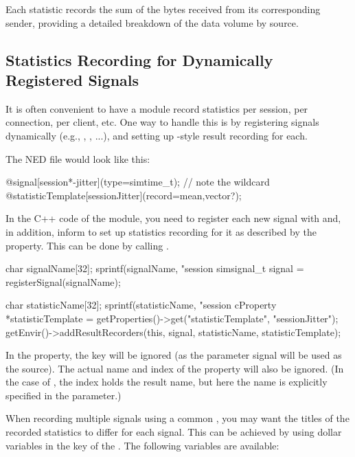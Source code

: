 Each statistic records the sum of the bytes received from its corresponding sender,
providing a detailed breakdown of the data volume by source.


\subsection{Statistics Recording for Dynamically Registered Signals}
\label{sec:simple-modules:statistic-recording-dynamic-signals}

It is often convenient to have a module record statistics per session, per
connection, per client, etc. One way to handle this is by registering
signals dynamically (e.g., , , ...),
and setting up -style result recording for each.

The NED file would look like this:

\begin{ned}
@signal[session*-jitter](type=simtime_t); // note the wildcard
@statisticTemplate[sessionJitter](record=mean,vector?);
\end{ned}

In the C++ code of the module, you need to register each new signal with
 and, in addition, inform {\opp} to set up statistics
recording for it as described by the  property.
This can be done by calling .

\begin{cpp}
char signalName[32];
sprintf(signalName, "session%
simsignal_t signal = registerSignal(signalName);

char statisticName[32];
sprintf(statisticName, "session%
cProperty *statisticTemplate =
    getProperties()->get("statisticTemplate", "sessionJitter");
getEnvir()->addResultRecorders(this, signal, statisticName, statisticTemplate);
\end{cpp}

In the  property, the  key will be
ignored (as the parameter signal will be used as the source). The actual
name and index of the property will also be ignored. (In the case of ,
the index holds the result name, but here the name is explicitly specified
in the  parameter.)

When recording multiple signals using a common ,
you may want the titles of the recorded statistics to differ for each signal.
This can be achieved by using dollar variables in the  key of the
. The following variables are available:


